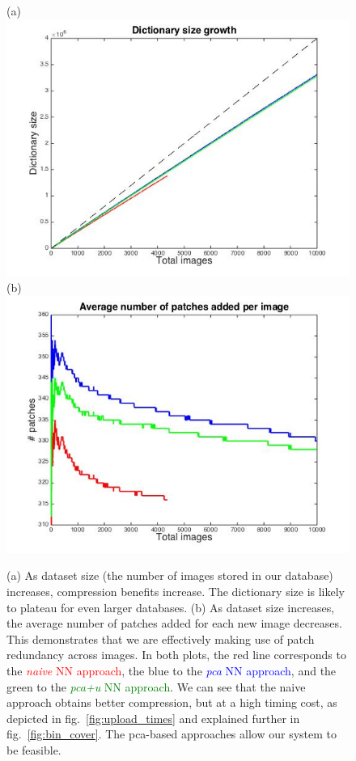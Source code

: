  \begin{figure}
\hspace{-10mm}
\centering
(a)\includegraphics[width=0.44\linewidth]{fig_NN/dict_growth.jpg}
(b)\includegraphics[width=0.44\linewidth]{fig_NN/ave_patches_per_img.jpg}
\caption{(a) As dataset size (the number of images stored in our database) increases, compression benefits increase. The dictionary size is likely to plateau for even larger databases. (b) As dataset size increases, the average number of patches added for each new image decreases. This demonstrates that we are effectively making use of patch redundancy across images. In both plots, the red line corresponds to the \textcolor{red}{\emph{naive} NN approach}, the blue to the \textcolor{blue}{\emph{pca} NN approach}, and the green to the \textcolor{green}{\emph{pca+u} NN approach}. We can see that the naive approach obtains better compression, but at a high timing cost, as depicted in fig.~\ref{fig:upload_times} and explained further in fig.~\ref{fig:bin_cover}. The pca-based approaches allow our system to be feasible.}
\label{fig:dict_growth}
\end{figure}

